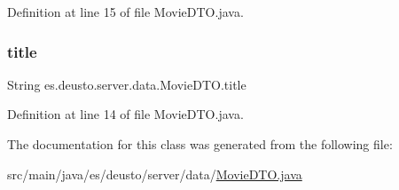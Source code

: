 Definition at line 15 of file Movie\+D\+T\+O.\+java.

\mbox{\label{classes_1_1deusto_1_1server_1_1data_1_1_movie_d_t_o_a09c5f5a8f9408f34e339e7149152839d}} 
\subsubsection{\texorpdfstring{title}{title}}
{\footnotesize\ttfamily String es.\+deusto.\+server.\+data.\+Movie\+D\+T\+O.\+title}



Definition at line 14 of file Movie\+D\+T\+O.\+java.



The documentation for this class was generated from the following file\+:\begin{DoxyCompactItemize}
\item 
src/main/java/es/deusto/server/data/\mbox{\hyperlink{_movie_d_t_o_8java}{Movie\+D\+T\+O.\+java}}\end{DoxyCompactItemize}
